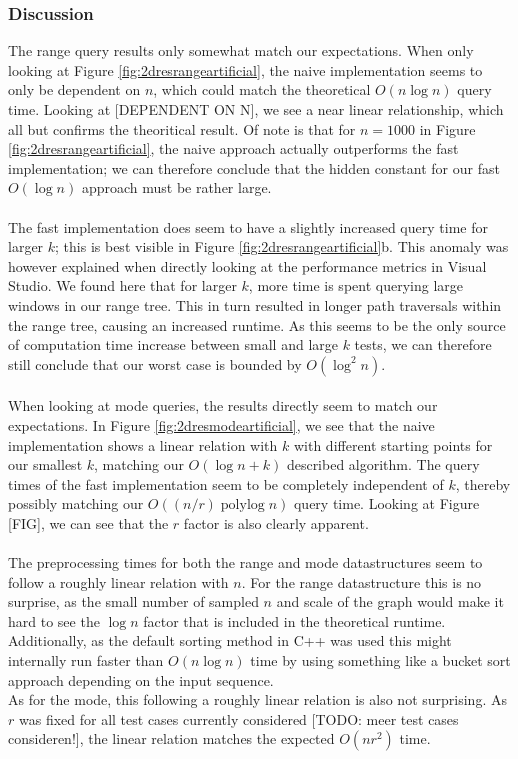 \documentclass{article}
\newcommand{\todo}[1]{{\color{red}[#1]}}
\newcommand{\fb}[1]{{\color{blue}#1}}
\DeclareMathOperator{\polylog}{polylog}
\begin{document}
\subsubsection*{Discussion}
\fb{The range query results only somewhat match our expectations. When only looking at Figure \ref{fig:2dresrangeartificial}, the naive implementation seems to only be dependent on $n$, which could match the theoretical $O(n \log n)$ query time. Looking at \todo{DEPENDENT ON N}, we see a near linear relationship, which all but confirms the theoritical result. Of note is that for $n=1000$ in Figure \ref{fig:2dresrangeartificial}, the naive approach actually outperforms the fast implementation; we can therefore conclude that the hidden constant for our fast $O(\log n)$ approach must be rather large. \\\\
The fast implementation does seem to have a slightly increased query time for larger $k$; this is best visible in Figure \ref{fig:2dresrangeartificial}b. This anomaly was however explained when directly looking at the performance metrics in Visual Studio. We found here that for larger $k$, more time is spent querying large windows in our range tree. This in turn resulted in longer path traversals within the range tree, causing an increased runtime. As this seems to be the only source of computation time increase between small and large $k$ tests, we can therefore still conclude that our worst case is bounded by $O(\log^2 n)$. \\\\
When looking at mode queries, the results directly seem to match our expectations. In Figure \ref{fig:2dresmodeartificial}, we see that the naive implementation shows a linear relation with $k$ with different starting points for our smallest $k$, matching our $O(\log n + k)$ described algorithm. The query times of the fast implementation seem to be completely independent of $k$, thereby possibly matching our $O((n/r) \polylog n)$ query time. Looking at Figure \todo{FIG}, we can see that the $r$ factor is also clearly apparent. \\\\
The preprocessing times for both the range and mode datastructures seem to follow a roughly linear relation with $n$. For the range datastructure this is no surprise, as the small number of sampled $n$ and scale of the graph would make it hard to see the $\log n$ factor that is included in the theoretical runtime. Additionally, as the default sorting method in C++ was used this might internally run faster than $O(n \log n)$ time by using something like a bucket sort approach depending on the input sequence. \\
As for the mode, this following a roughly linear relation is also not surprising. As $r$ was fixed for all test cases currently considered \todo{TODO: meer test cases consideren!}, the linear relation matches the expected \fb{$O(nr^2)$} time}.
\end{document}
